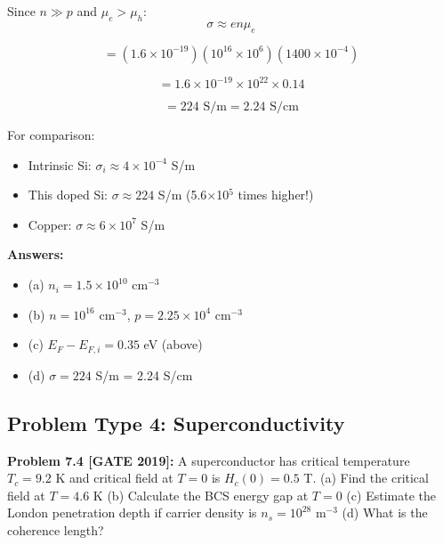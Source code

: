 \documentclass[12pt,a4paper]{article}
\begin{document}
\begin{solution}
Since $n \gg p$ and $\mu_e > \mu_h$:
$$\sigma \approx en\mu_e$$

$$= (1.6 \times 10^{-19})(10^{16} \times 10^6)(1400 \times 10^{-4})$$

$$= 1.6 \times 10^{-19} \times 10^{22} \times 0.14$$

$$= 224\text{ S/m} = 2.24\text{ S/cm}$$

For comparison:
\begin{itemize}
    \item Intrinsic Si: $\sigma_i \approx 4 \times 10^{-4}$ S/m
    \item This doped Si: $\sigma \approx 224$ S/m (5.6×10$^5$ times higher!)
    \item Copper: $\sigma \approx 6 \times 10^7$ S/m
\end{itemize}

\textbf{Answers:}
\begin{itemize}
    \item (a) $n_i = 1.5 \times 10^{10}$ cm$^{-3}$
    \item (b) $n = 10^{16}$ cm$^{-3}$, $p = 2.25 \times 10^{4}$ cm$^{-3}$
    \item (c) $E_F - E_{F,i} = 0.35$ eV (above)
    \item (d) $\sigma = 224$ S/m = 2.24 S/cm
\end{itemize}
\end{solution}

\subsection{Problem Type 4: Superconductivity}

\textbf{Problem 7.4 [GATE 2019]:} A superconductor has critical temperature $T_c = 9.2$ K and critical field at $T = 0$ is $H_c(0) = 0.5$ T.
(a) Find the critical field at $T = 4.6$ K
(b) Calculate the BCS energy gap at $T = 0$
(c) Estimate the London penetration depth if carrier density is $n_s = 10^{28}$ m$^{-3}$
(d) What is the coherence length?
\end{document}
